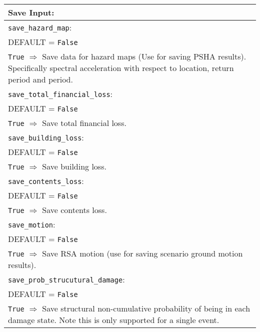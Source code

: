 \vspace{2em}
\begin{tabular}{|p{\textwidth}|}
\hline
\vspace{0.3em} \noindent \Large \textbf{Save Input:} \normalsize \\
\hline \vspace{0.1em} \texttt{save\_hazard\_map}: \\
DEFAULT = \texttt{False} \\
\texttt{True} $\Rightarrow$ Save data for hazard maps (Use for saving
PSHA results). Specifically spectral acceleration with respect to
location, return period and period.\\
\hline \vspace{0.1em} \texttt{save\_total\_financial\_loss}: \\
DEFAULT = \texttt{False} \\
\texttt{True} $\Rightarrow$ Save total financial loss. \\
 \hline
\vspace{0.1em} \texttt{save\_building\_loss}: \\
DEFAULT = \texttt{False} \\
\texttt{True} $\Rightarrow$ Save building loss. \\
 \hline
\vspace{0.1em} \texttt{save\_contents\_loss}: \\
DEFAULT = \texttt{False} \\
 \texttt{True} $\Rightarrow$ Save contents loss. \\
\hline \vspace{0.1em} \texttt{save\_motion}: \\
DEFAULT = \texttt{False} \\
\texttt{True} $\Rightarrow$ Save RSA motion (use for saving scenario ground motion results). \\
\hline \vspace{0.1em} \texttt{save\_prob\_strucutural\_damage}: \\
DEFAULT = \texttt{False} \\
\texttt{True} $\Rightarrow$ Save structural non-cumulative
probability of being in each
damage state.  Note this is only supported for a single event. \\
\hline
 \end{tabular}
